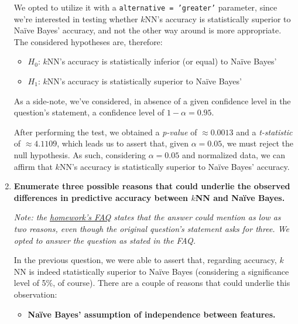 \documentclass[12pt]{article}
\begin{document}
\begin{enumerate}[leftmargin=\labelsep,resume]
        We opted to utilize it with a \texttt{alternative = 'greater'} parameter, since
        we're interested in testing whether $k$NN's accuracy is statistically superior
        to Naïve Bayes' accuracy, and not the other way around is more appropriate.
        The considered hypotheses are, therefore:

        \begin{itemize}
          \item $H_0$: $k$NN's accuracy is statistically inferior (or equal) to Naïve Bayes'
          \item $H_1$: $k$NN's accuracy is statistically superior to Naïve Bayes'
        \end{itemize}

        As a side-note, we've considered, in absence of a given confidence level in the
        question's statement, a confidence level of $1 - \alpha = 0.95$.

        After performing the test, we obtained a \textit{p-value} of $\approx 0.0013$ and
        a \textit{t-statistic} of $\approx 4.1109$, which leads us to assert that, given
        $\alpha = 0.05$, we must reject the null hypothesis.
        As such, considering $\alpha = 0.05$ and normalized data, we can affirm that
        $k$NN's accuracy is statistically superior to Naïve Bayes' accuracy.

        \pagebreak

  \item \textbf{Enumerate three possible reasons that could underlie the observed differences in predictive
          accuracy between $k$NN and Naïve Bayes.}

        \textit{Note: the \href{https://fenix.tecnico.ulisboa.pt/disciplinas/Apre2/2022-2023/1-semestre/homeworks}{homework's FAQ}
          states that the answer could mention as low as two reasons, even though the original
          question's statement asks for three. We opted to answer the question as stated in
          the FAQ.}

        \vspace*{0.5cm}

        In the previous question, we were able to assert that, regarding accuracy, $k$NN is
        indeed statistically superior to Naïve Bayes (considering a significance level of
        5\%, of course). There are a couple of reasons that could underlie this observation:

        \begin{itemize}
          \item \textbf{Naïve Bayes' assumption of independence between features.}


\end{itemize}
\end{enumerate}
\end{document}

